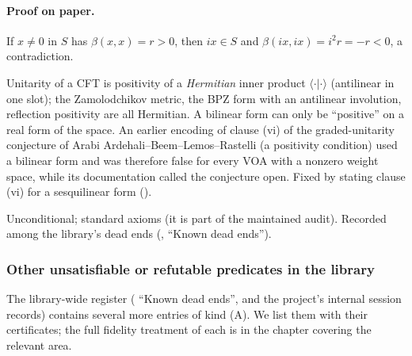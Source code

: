 \paragraph{Proof on paper.} If $x\neq0$ in $S$ has $\beta(x,x)=r>0$, then $ix\in S$ and
$\beta(ix,ix)=i^2r=-r<0$, a contradiction.

\begin{physics}
Unitarity of a CFT is positivity of a \emph{Hermitian} inner product $\langle\cdot|\cdot\rangle$
(antilinear in one slot); the Zamolodchikov metric, the BPZ form with an antilinear involution,
reflection positivity are all Hermitian. A bilinear form can only be ``positive'' on a real form of
the space. An earlier encoding of clause (vi) of the graded-unitarity conjecture of
Arabi Ardehali--Beem--Lemos--Rastelli (a positivity condition) used a bilinear form and was therefore false for every
VOA with a nonzero weight space, while its documentation called the conjecture open. Fixed by
stating clause (vi) for a sesquilinear form ().
\end{physics}

\begin{status}
Unconditional; standard axioms (it is part of the maintained audit). Recorded among the
library's dead ends (, ``Known dead ends'').
\end{status}

\subsubsection{Other unsatisfiable or refutable predicates in the library}

The library-wide register ( ``Known dead ends'', and the project's internal session records) contains several more
entries of kind (A). We list them with their certificates; the full fidelity treatment of each is
in the chapter covering the relevant area.

